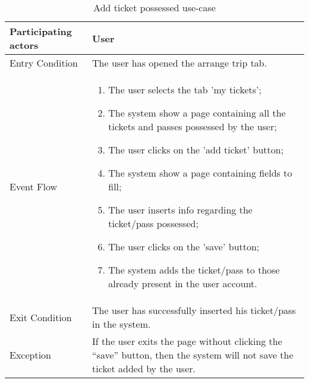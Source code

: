 \begin{table}[H]
	\begin{center}
		\begin{tabular}{ | p{} | p{} | }
		\hline
		Participating actors & User\\
		\hline
		Entry Condition & The user has opened the arrange trip tab.\\
		\hline
		Event Flow & 
			\begin{enumerate}
				\item The user selects the tab 'my tickets';
				\item The system show a page containing all the tickets and passes possessed by the user;
				\item The user clicks on the 'add ticket' button;
				\item The system show a page containing fields to fill;
				\item The user inserts info regarding the ticket/pass possessed;
				\item The user clicks on the 'save' button;
				\item The system adds the ticket/pass to those already present in the user account.
			\end{enumerate} \\
		\hline
		Exit Condition & The user has successfully inserted his ticket/pass in the system.\\
		\hline
		Exception & If the user exits the page without clicking the “save” button, then the system will not save the ticket added by the user.\\ 
		\hline
		\end{tabular}
	\end{center}
	\caption{Add ticket possessed use-case}
\end{table}